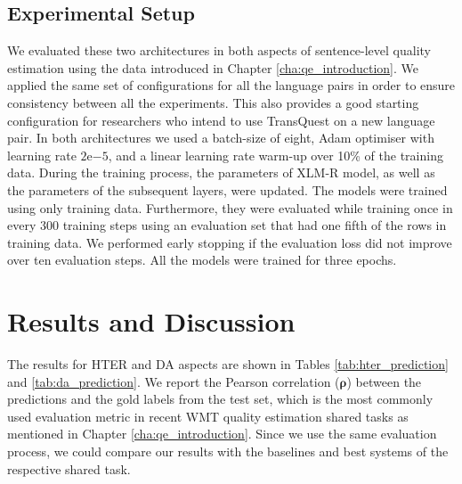 \subsection{Experimental Setup}
We evaluated these two architectures in both aspects of sentence-level quality estimation using the data introduced in Chapter \ref{cha:qe_introduction}. We applied the same set of configurations for all the language pairs in order to ensure consistency between all the experiments. This also provides a good starting configuration for researchers who intend to use TransQuest on a new language pair. In both architectures we used a batch-size of eight, Adam optimiser with learning rate $2\mathrm{e}{-5}$, and a linear learning rate warm-up over 10\% of the training data. During the training process, the parameters of XLM-R model, as well as the parameters of the subsequent layers, were updated. The models were trained using only training data. Furthermore, they were evaluated while training once in every 300 training steps using an evaluation set that had one fifth of the rows in training data. We performed early stopping if the evaluation loss did not improve over ten evaluation steps. All the models were trained for three epochs.

\section{Results and Discussion}
The results for HTER and DA aspects are shown in Tables \ref{tab:hter_prediction} and \ref{tab:da_prediction}. We report the Pearson correlation ($\bm{\rho}$) between the predictions and the gold labels from the test set, which is the most commonly used evaluation metric in recent WMT quality estimation shared tasks \cite{specia-etal-2018-findings,fonseca-etal-2019-findings,specia-etal-2020-findings-wmt} as mentioned in Chapter \ref{cha:qe_introduction}. Since we use the same evaluation process, we could compare our results with the baselines and best systems of the respective shared task.

